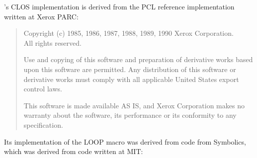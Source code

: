 \cmucl{}'s CLOS implementation is derived from the PCL reference
implementation written at Xerox PARC:
\begin{quotation}
\noindent Copyright (c) 1985, 1986, 1987, 1988, 1989, 1990 Xerox
Corporation.\\
All rights reserved.

\vspace{1ex}
\noindent Use and copying of this software and preparation of
derivative works based upon this software are permitted.  Any
distribution of this software or derivative works must comply with all
applicable United States export control laws.

\vspace{1ex}
\noindent This software is made available AS IS, and Xerox Corporation
makes no warranty about the software, its performance or its
conformity to any specification.
\end{quotation}
Its implementation of the LOOP macro was derived from code from
Symbolics, which was derived from code written at MIT:
